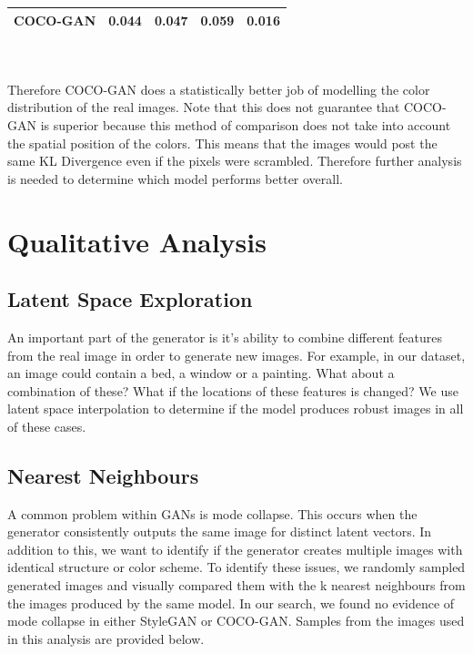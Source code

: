 \documentclass[10pt]{article}
\begin{document}
\begin{multicols*}{2}
\begin{tabular}{ |p{2cm}|p{1cm}|p{1cm}|p{1cm}|p{1cm}|  }
            \hline
            COCO-GAN  & 0.044    & 0.047      & 0.059     &  0.016\\
            \hline
        \end{tabular}
        \\\\
        Therefore COCO-GAN does a statistically better job of modelling the color distribution of the real images. Note that this does not guarantee that COCO-GAN is superior because this method of comparison does not take into account the spatial position of the colors. This means that the images would post the same KL Divergence even if the pixels were scrambled. Therefore further analysis is needed to determine which model performs better overall.


        \section{Qualitative Analysis}
        \label{sec:qualitative}
        \subsection{Latent Space Exploration}
        \label{subsec:latentSpaceExploration}
        An important part of the generator is it's ability to combine different features from the real image in order to generate new images.
        For example, in our dataset, an image could contain a bed, a window or a painting. What about a combination of these?
        What if the locations of these features is changed? We use latent space interpolation to determine if the model produces robust images in all of these cases.

        \subsection{Nearest Neighbours}
        \label{subsec:nearestneighbours}
        A common problem within GANs is mode collapse.
        This occurs when the generator consistently outputs the same image for distinct latent vectors.
        In addition to this, we want to identify if the generator creates multiple images with identical structure or color scheme.
        To identify these issues, we randomly sampled generated images and visually compared them with the k nearest neighbours from the images produced by the same model.
        In our search, we found no evidence of mode collapse in either StyleGAN or COCO-GAN. Samples from the images used in this analysis are provided below.


\end{multicols*}
\end{document}
